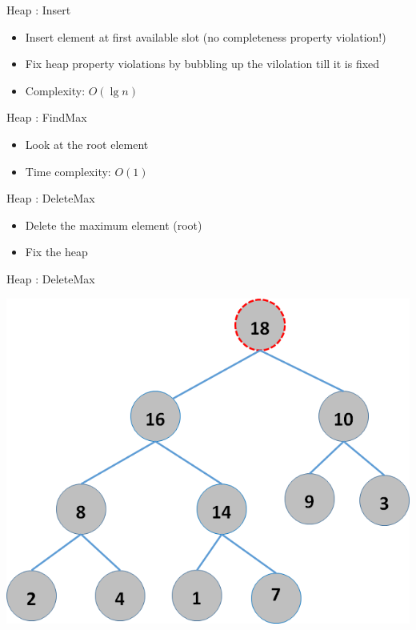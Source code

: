 \documentclass{beamer}
\begin{document}
\begin{frame}{Heap : Insert}
    \begin{itemize}
        \item Insert element at first available slot (no completeness property violation!)
        \item Fix heap property violations by bubbling up the vilolation till it is fixed
        \item Complexity: \pause $O(\lg n)$
    \end{itemize}
\end{frame}

\begin{frame}{Heap : FindMax}
    \begin{itemize}
        \item Look at the root element
        \item Time complexity: $O(1)$
    \end{itemize}
\end{frame}

\begin{frame}{Heap : DeleteMax}
    \begin{itemize}
        \item Delete the maximum element (root)
        \item Fix the heap
    \end{itemize}
\end{frame}

\begin{frame}{Heap : DeleteMax}
    \begin{center}
        \includegraphics[scale=0.5]{heapDelete1.png}
    \end{center}
\end{frame}
\end{document}
